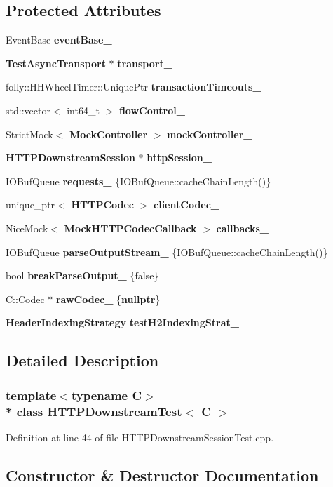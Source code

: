 \subsection*{Protected Attributes}
\begin{DoxyCompactItemize}
\item 
Event\+Base {\bf event\+Base\+\_\+}
\item 
{\bf Test\+Async\+Transport} $\ast$ {\bf transport\+\_\+}
\item 
folly\+::\+H\+H\+Wheel\+Timer\+::\+Unique\+Ptr {\bf transaction\+Timeouts\+\_\+}
\item 
std\+::vector$<$ int64\+\_\+t $>$ {\bf flow\+Control\+\_\+}
\item 
Strict\+Mock$<$ {\bf Mock\+Controller} $>$ {\bf mock\+Controller\+\_\+}
\item 
{\bf H\+T\+T\+P\+Downstream\+Session} $\ast$ {\bf http\+Session\+\_\+}
\item 
I\+O\+Buf\+Queue {\bf requests\+\_\+} \{I\+O\+Buf\+Queue\+::cache\+Chain\+Length()\}
\item 
unique\+\_\+ptr$<$ {\bf H\+T\+T\+P\+Codec} $>$ {\bf client\+Codec\+\_\+}
\item 
Nice\+Mock$<$ {\bf Mock\+H\+T\+T\+P\+Codec\+Callback} $>$ {\bf callbacks\+\_\+}
\item 
I\+O\+Buf\+Queue {\bf parse\+Output\+Stream\+\_\+} \{I\+O\+Buf\+Queue\+::cache\+Chain\+Length()\}
\item 
bool {\bf break\+Parse\+Output\+\_\+} \{false\}
\item 
C\+::\+Codec $\ast$ {\bf raw\+Codec\+\_\+} \{{\bf nullptr}\}
\item 
{\bf Header\+Indexing\+Strategy} {\bf test\+H2\+Indexing\+Strat\+\_\+}
\end{DoxyCompactItemize}


\subsection{Detailed Description}
\subsubsection*{template$<$typename C$>$\\*
class H\+T\+T\+P\+Downstream\+Test$<$ C $>$}



Definition at line 44 of file H\+T\+T\+P\+Downstream\+Session\+Test.\+cpp.



\subsection{Constructor \& Destructor Documentation}
